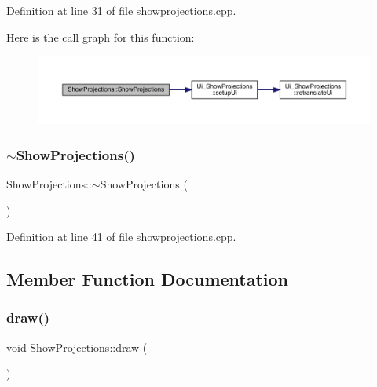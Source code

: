 Definition at line 31 of file showprojections.\+cpp.

Here is the call graph for this function\+:
\nopagebreak
\begin{figure}[H]
\begin{center}
\leavevmode
\includegraphics[width=350pt]{class_show_projections_a9d5dd82bfa3dc9b28aa04e4d643cd38b_cgraph}
\end{center}
\end{figure}
\mbox{\label{class_show_projections_a63c65a092f0ea092e48de24798df8732}} 
\subsubsection{\texorpdfstring{$\sim$\+Show\+Projections()}{~ShowProjections()}}
{\footnotesize\ttfamily Show\+Projections\+::$\sim$\+Show\+Projections (\begin{DoxyParamCaption}{ }\end{DoxyParamCaption})}



Definition at line 41 of file showprojections.\+cpp.



\subsection{Member Function Documentation}
\mbox{\label{class_show_projections_aaaf367e35dded9fbb5971b5e5a134373}} 
\subsubsection{\texorpdfstring{draw()}{draw()}}
{\footnotesize\ttfamily void Show\+Projections\+::draw (\begin{DoxyParamCaption}{ }\end{DoxyParamCaption})}



